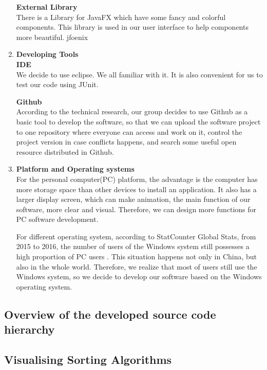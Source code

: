 \documentclass[paper=a4, fontsize=11pt,twoside]{scrartcl}		%
\begin{document}
\begin{enumerate}
\textbf{External Library}\\
There is a Library for JavaFX which have some fancy and colorful components. This library is used in our user interface to help components more beautiful. jfoenix
  
\item{\textbf{Developing Tools}}\\

\textbf{IDE}\\
We decide to use eclipse. We all familiar with it. It is also convenient for us to test our code using JUnit. 


\textbf{Github}\\
According to the technical research, our group decides to use Github as a basic tool to develop the software, so that we can upload the software project to one repository where everyone can access and work on it, control the project version in case conflicts happens, and search some useful open resource distributed in Github.


\item \textbf{Platform and Operating systems}\\
For the personal computer(PC) platform, the advantage is the computer has more storage space than other devices to install an application. It also has a larger display screen, which can make animation, the main function of our software, more clear and visual. Therefore, we can design more functions for PC software development. 

For different operating system, according to StatCounter Global Stats, from 2015 to 2016, the number of users of the Windows system still possesses a high proportion of PC users \cite{Stats2016}. This situation happens not only in China, but also in the whole world. Therefore,
we realize that most of users still use the Windows system, so we decide to develop our software based on the Windows operating system. 



\end{enumerate}

\subsection{Overview of the developed source code hierarchy}





\subsection{Visualising Sorting Algorithms}
\end{document}
